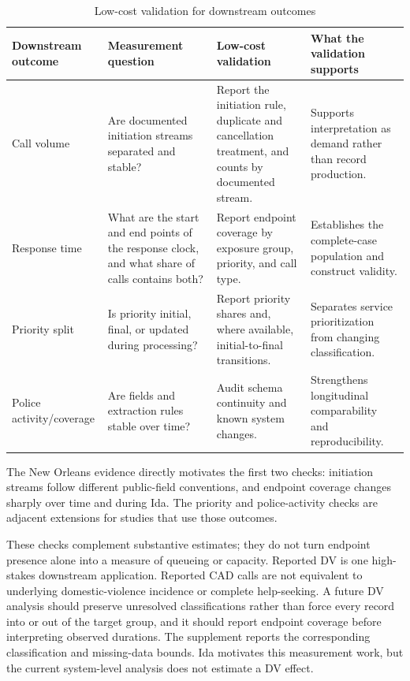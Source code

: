 \documentclass[11pt]{article}
\begin{document}
\begin{table}[!htbp]
\centering
\small
\renewcommand{\arraystretch}{1.12}
\caption{Low-cost validation for downstream outcomes}
\label{tab:implications}
\begin{tabularx}{\textwidth}{@{}>{\raggedright\arraybackslash}p{}>{\raggedright\arraybackslash}p{}>{\raggedright\arraybackslash}p{}>{\raggedright\arraybackslash}X@{}}
\toprule
Downstream outcome & Measurement question & Low-cost validation & What the validation supports \\
\midrule
Call volume &
Are documented initiation streams separated and stable? &
Report the initiation rule, duplicate and cancellation treatment, and counts by documented stream. &
Supports interpretation as demand rather than record production. \\
Response time &
What are the start and end points of the response clock, and what share of calls contains both? &
Report endpoint coverage by exposure group, priority, and call type. &
Establishes the complete-case population and construct validity. \\
Priority split &
Is priority initial, final, or updated during processing? &
Report priority shares and, where available, initial-to-final transitions. &
Separates service prioritization from changing classification. \\
Police activity/coverage &
Are fields and extraction rules stable over time? &
Audit schema continuity and known system changes. &
Strengthens longitudinal comparability and reproducibility. \\
\bottomrule
\end{tabularx}
\end{table}

The New Orleans evidence directly motivates the first two checks: initiation streams follow different public-field conventions, and endpoint coverage changes sharply over time and during Ida. The priority and police-activity checks are adjacent extensions for studies that use those outcomes.

These checks complement substantive estimates; they do not turn endpoint presence alone into a measure of queueing or capacity. Reported DV is one high-stakes downstream application. Reported CAD calls are not equivalent to underlying domestic-violence incidence or complete help-seeking. A future DV analysis should preserve unresolved classifications rather than force every record into or out of the target group, and it should report endpoint coverage before interpreting observed durations. The supplement reports the corresponding classification and missing-data bounds. Ida motivates this measurement work, but the current system-level analysis does not estimate a DV effect.
\end{document}
